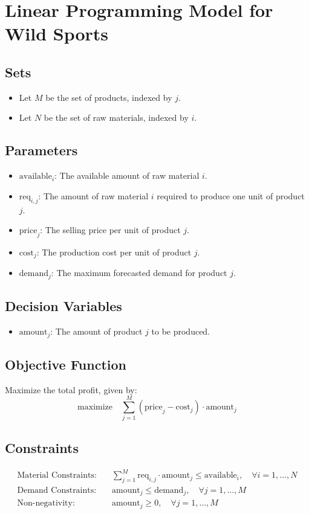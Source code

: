\documentclass{article}
\begin{document}
\section*{Linear Programming Model for Wild Sports}

\subsection*{Sets}
\begin{itemize}
    \item Let \( M \) be the set of products, indexed by \( j \).
    \item Let \( N \) be the set of raw materials, indexed by \( i \).
\end{itemize}

\subsection*{Parameters}
\begin{itemize}
    \item \( \text{available}_i \): The available amount of raw material \( i \).
    \item \( \text{req}_{i,j} \): The amount of raw material \( i \) required to produce one unit of product \( j \).
    \item \( \text{price}_j \): The selling price per unit of product \( j \).
    \item \( \text{cost}_j \): The production cost per unit of product \( j \).
    \item \( \text{demand}_j \): The maximum forecasted demand for product \( j \).
\end{itemize}

\subsection*{Decision Variables}
\begin{itemize}
    \item \( \text{amount}_j \): The amount of product \( j \) to be produced.
\end{itemize}

\subsection*{Objective Function}
Maximize the total profit, given by:
\[
\text{maximize} \quad \sum_{j=1}^{M} (\text{price}_j - \text{cost}_j) \cdot \text{amount}_j
\]

\subsection*{Constraints}
\begin{align*}
\text{Material Constraints:} \quad & \sum_{j=1}^{M} \text{req}_{i,j} \cdot \text{amount}_j \leq \text{available}_i, \quad \forall i = 1, \ldots, N \\
\text{Demand Constraints:} \quad & \text{amount}_j \leq \text{demand}_j, \quad \forall j = 1, \ldots, M \\
\text{Non-negativity:} \quad & \text{amount}_j \geq 0, \quad \forall j = 1, \ldots, M
\end{align*}
\end{document}
